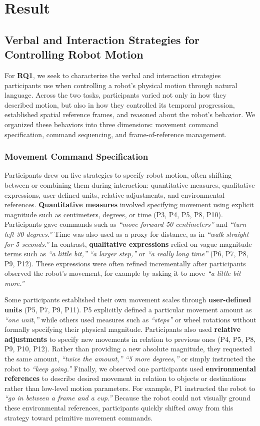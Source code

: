 \section{Result}

\subsection{Verbal and Interaction Strategies for Controlling Robot Motion}
For \textbf{RQ1}, we seek to characterize the verbal and interaction strategies participants use when controlling a robot's physical motion through natural language. Across the two tasks, participants varied not only in how they described motion, but also in how they controlled its temporal progression, established spatial reference frames, and reasoned about the robot's behavior. We organized these behaviors into three dimensions: movement command specification, command sequencing, and frame-of-reference management.

\subsubsection{Movement Command Specification}
Participants drew on five strategies to specify robot motion, often shifting between or combining them during interaction: quantitative measures, qualitative expressions, user-defined units, relative adjustments, and environmental references. \textbf{Quantitative measures} involved specifying movement using explicit magnitude such as centimeters, degrees, or time (P3, P4, P5, P8, P10). Participants gave commands such as \emph{``move forward 50 centimeters''} and \emph{``turn left 30 degrees.''} Time was also used as a proxy for distance, as in \emph{``walk straight for 5 seconds.''} In contrast, \textbf{qualitative expressions} relied on vague magnitude terms such as \emph{``a little bit,''} \emph{``a larger step,''} or \emph{``a really long time''} (P6, P7, P8, P9, P12). These expressions were often refined incrementally after participants observed the robot's movement, for example by asking it to move \emph{``a little bit more.''}

Some participants established their own movement scales through \textbf{user-defined units} (P5, P7, P9, P11). P5 explicitly defined a particular movement amount as \emph{``one unit,''} while others used measures such as \emph{``steps''} or wheel rotations without formally specifying their physical magnitude. Participants also used \textbf{relative adjustments} to specify new movements in relation to previous ones (P4, P5, P8, P9, P10, P12). Rather than providing a new absolute magnitude, they requested the same amount, \emph{``twice the amount,''} \emph{``5 more degrees,''} or simply instructed the robot to \emph{``keep going.''} Finally, we observed one participants used \textbf{environmental references} to describe desired movement in relation to objects or destinations rather than low-level motion parameters. For example, P1 instructed the robot to \emph{``go in between a frame and a cup.''} Because the robot could not visually ground these environmental references, participants quickly shifted away from this strategy toward primitive movement commands.

